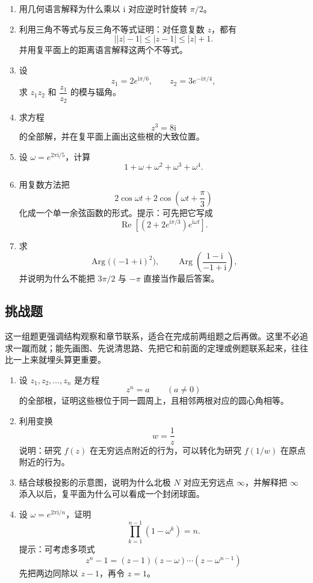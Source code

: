 \begin{enumerate}
    \item 用几何语言解释为什么乘以 $\mathrm{i}$ 对应逆时针旋转 $\pi/2$。

    \item 利用三角不等式与反三角不等式证明：对任意复数 $z$，都有
    \[
        \bigl||z|-1\bigr|\le |z-1|\le |z|+1.
    \]
    并用复平面上的距离语言解释这两个不等式。

    \item 设
    \[
        z_1=2e^{\mathrm{i}\pi/6},\qquad z_2=3e^{-\mathrm{i}\pi/4},
    \]
    求 $z_1z_2$ 和 $\dfrac{z_1}{z_2}$ 的模与辐角。

    \item 求方程
    \[
        z^3=8\mathrm{i}
    \]
    的全部解，并在复平面上画出这些根的大致位置。

    \item 设 $\omega=e^{2\pi\mathrm{i}/5}$，计算
    \[
        1+\omega+\omega^2+\omega^3+\omega^4.
    \]

    \item 用复数方法把
    \[
        2\cos\omega t+2\cos\left(\omega t+\frac{\pi}{3}\right)
    \]
    化成一个单一余弦函数的形式。提示：可先把它写成
    \[
        \operatorname{Re}\left[\left(2+2e^{\mathrm{i}\pi/3}\right)e^{\mathrm{i}\omega t}\right].
    \]

    \item 求
    \[
        \operatorname{Arg}\bigl((-1+\mathrm{i})^2\bigr),\qquad
        \operatorname{Arg}\left(\frac{1-\mathrm{i}}{-1+\mathrm{i}}\right),
    \]
    并说明为什么不能把 $3\pi/2$ 与 $-\pi$ 直接当作最后答案。
\end{enumerate}

\subsection{挑战题}

这一组题更强调结构观察和章节联系，适合在完成前两组题之后再做。这里不必追求一蹴而就；能先画图、先说清思路、先把它和前面的定理或例题联系起来，往往比一上来就埋头算更重要。

\begin{enumerate}
    \item 设 $z_1,z_2,\dots,z_n$ 是方程
    \[
        z^n=a\qquad (a\neq 0)
    \]
    的全部根，证明这些根位于同一圆周上，且相邻两根对应的圆心角相等。

    \item 利用变换
    \[
        w=\frac{1}{z}
    \]
    说明：研究 $f(z)$ 在无穷远点附近的行为，可以转化为研究 $f(1/w)$ 在原点附近的行为。

    \item 结合球极投影的示意图，说明为什么北极 $N$ 对应无穷远点 $\infty$，并解释把 $\infty$ 添入以后，复平面为什么可以看成一个封闭球面。

    \item 设 $\omega=e^{2\pi\mathrm{i}/n}$，证明
    \[
        \prod_{k=1}^{n-1}(1-\omega^k)=n.
    \]
    提示：可考虑多项式
    \[
        z^n-1=(z-1)(z-\omega)\cdots(z-\omega^{n-1})
    \]
    先把两边同除以 $z-1$，再令 $z=1$。
\end{enumerate}
